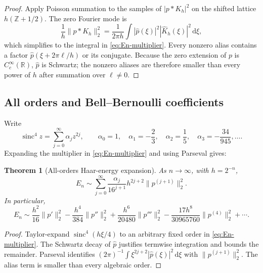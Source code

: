 \documentclass[11pt,oneside]{article}
\newtheorem{theorem}{Theorem}[section]
\theoremstyle{definition}
\theoremstyle{remark}
\newcommand{\R}{\mathbb R}
\newcommand{\Z}{\mathbb Z}
\newcommand{\sinc}{\operatorname{sinc}}
\newcommand{\dd}{\,\mathrm d}
\begin{document}
\begin{proof}
Apply Poisson summation to the samples of $|p*K_h|^2$ on the shifted lattice
$h(\Z+1/2)$.  The zero Fourier mode is
\[
 \frac1h\|p*K_h\|_2^2
 =\frac1{2\pi h}\int|\widehat p(\xi)|^2
 |\widehat K_h(\xi)|^2\dd\xi,
\]
which simplifies to the integral in \eqref{eq:En-multiplier}.  Every nonzero
alias contains a factor $\widehat p(\xi+2\pi\ell/h)$ or its conjugate.
Because the zero extension of $p$ is $C_c^\infty(\R)$,
$\widehat p$ is Schwartz; the nonzero aliases are therefore smaller than every
power of $h$ after summation over $\ell\ne0$.
\end{proof}

\subsection{All orders and Bell--Bernoulli coefficients}

Write
\begin{equation}\label{eq:alpha-sinc4}
 \sinc^4z=\sum_{j=0}^\infty\alpha_jz^{2j},
 \qquad
 \alpha_0=1,\quad \alpha_1=-\frac23,
 \quad \alpha_2=\frac15,
 \quad \alpha_3=-\frac{34}{945},\ldots.
\end{equation}
Expanding the multiplier in \eqref{eq:En-multiplier} and using Parseval gives:

\begin{theorem}[All-orders Haar-energy expansion]
\label{thm:Haar-energy-all-orders}
As $n\to\infty$, with $h=2^{-n}$,
\begin{equation}\label{eq:En-all-orders}
 E_n\sim\sum_{j=0}^\infty
 \frac{\alpha_j}{16^{j+1}}h^{2j+2}
 \|p^{(j+1)}\|_2^2.
\end{equation}
In particular,
\begin{equation}\label{eq:En-first-terms}
 E_n\sim
 \frac{h^2}{16}\|p'\|_2^2
 -\frac{h^4}{384}\|p''\|_2^2
 +\frac{h^6}{20480}\|p'''\|_2^2
 -\frac{17h^8}{30965760}\|p^{(4)}\|_2^2+\cdots.
\end{equation}
\end{theorem}

\begin{proof}
Taylor-expand $\sinc^4(h\xi/4)$ to an arbitrary fixed order in
\eqref{eq:En-multiplier}.  The Schwartz decay of $\widehat p$ justifies
termwise integration and bounds the remainder.  Parseval identifies
$(2\pi)^{-1}\int\xi^{2j+2}|\widehat p(\xi)|^2\dd\xi$ with
$\|p^{(j+1)}\|_2^2$.  The alias term is smaller than every algebraic order.
\end{proof}
\end{document}
